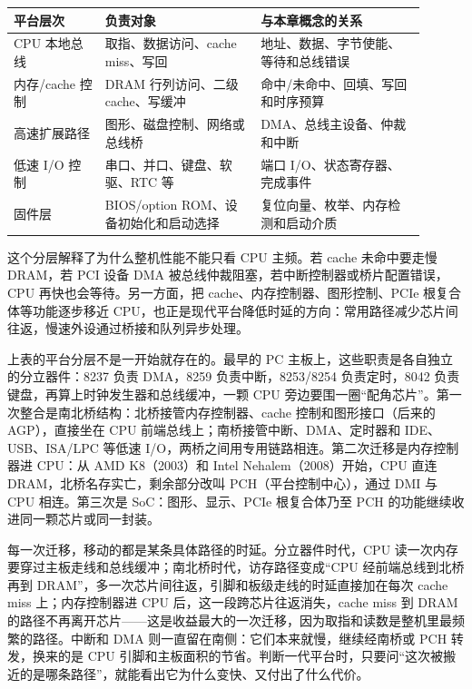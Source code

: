 \begin{longtable}{L{0.2\linewidth}L{0.34\linewidth}L{0.36\linewidth}}
\toprule
平台层次 & 负责对象 & 与本章概念的关系 \\
\midrule
CPU 本地总线 & 取指、数据访问、cache miss、写回 & 地址、数据、字节使能、等待和总线错误 \\
内存/cache 控制 & DRAM 行列访问、二级 cache、写缓冲 & 命中/未命中、回填、写回和时序预算 \\
高速扩展路径 & 图形、磁盘控制、网络或总线桥 & DMA、总线主设备、仲裁和中断 \\
低速 I/O 控制 & 串口、并口、键盘、软驱、RTC 等 & 端口 I/O、状态寄存器、完成事件 \\
固件层 & BIOS/option ROM、设备初始化和启动选择 & 复位向量、枚举、内存检测和启动介质 \\
\bottomrule
\end{longtable}

这个分层解释了为什么整机性能不能只看 CPU 主频。若 cache 未命中要走慢 DRAM，若 PCI 设备 DMA 被总线仲裁阻塞，若中断控制器或桥片配置错误，CPU 再快也会等待。另一方面，把 cache、内存控制器、图形控制、PCIe 根复合体等功能逐步移近 CPU，也正是现代平台降低时延的方向：常用路径减少芯片间往返，慢速外设通过桥接和队列异步处理。

上表的平台分层不是一开始就存在的。最早的 PC 主板上，这些职责是各自独立的分立器件：8237 负责 DMA，8259 负责中断，8253/8254 负责定时，8042 负责键盘，再算上时钟发生器和总线缓冲，一颗 CPU 旁边要围一圈“配角芯片”。第一次整合是南北桥结构：北桥接管内存控制器、cache 控制和图形接口（后来的 AGP），直接坐在 CPU 前端总线上；南桥接管中断、DMA、定时器和 IDE、USB、ISA/LPC 等低速 I/O，两桥之间用专用链路相连。第二次迁移是内存控制器进 CPU：从 AMD K8（2003）和 Intel Nehalem（2008）开始，CPU 直连 DRAM，北桥名存实亡，剩余部分改叫 PCH（平台控制中心），通过 DMI 与 CPU 相连。第三次是 SoC：图形、显示、PCIe 根复合体乃至 PCH 的功能继续收进同一颗芯片或同一封装。

每一次迁移，移动的都是某条具体路径的时延。分立器件时代，CPU 读一次内存要穿过主板走线和总线缓冲；南北桥时代，访存路径变成“CPU 经前端总线到北桥再到 DRAM”，多一次芯片间往返，引脚和板级走线的时延直接加在每次 cache miss 上；内存控制器进 CPU 后，这一段跨芯片往返消失，cache miss 到 DRAM 的路径不再离开芯片——这是收益最大的一次迁移，因为取指和读数是整机里最频繁的路径。中断和 DMA 则一直留在南侧：它们本来就慢，继续经南桥或 PCH 转发，换来的是 CPU 引脚和主板面积的节省。判断一代平台时，只要问“这次被搬近的是哪条路径”，就能看出它为什么变快、又付出了什么代价。

